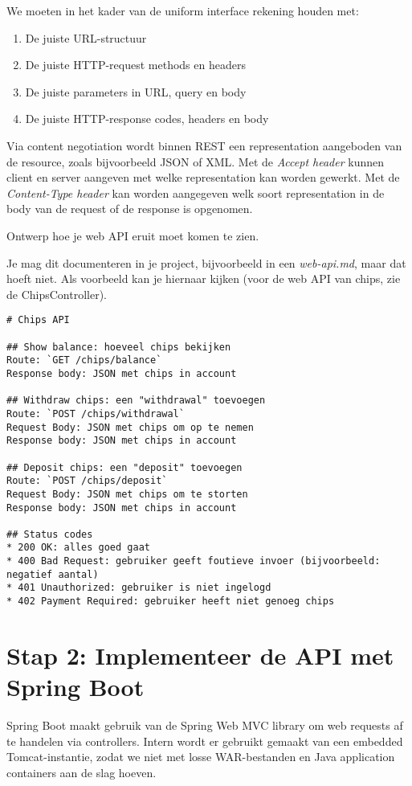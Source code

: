 We moeten in het kader van de uniform interface rekening houden met:
\begin{enumerate}
    \item De juiste URL-structuur
    \item De juiste HTTP-request methods en headers
    \item De juiste parameters in URL, query en body
    \item De juiste HTTP-response codes, headers en body
\end{enumerate}

Via content negotiation wordt binnen REST een representation 
aangeboden van de resource, zoals bijvoorbeeld JSON of XML. 
Met de \textit{Accept header} kunnen client en server aangeven 
met welke representation kan worden gewerkt. 
Met de \textit{Content-Type header} kan worden aangegeven 
welk soort representation in de body van de request of de response is opgenomen.

Ontwerp hoe je web API eruit moet komen te zien.

Je mag dit documenteren in je project,
bijvoorbeeld in een \textit{web-api.md}, maar dat hoeft niet.
Als voorbeeld kan je hiernaar kijken (voor de web API van chips, zie de ChipsController).
\begin{verbatim}
# Chips API

## Show balance: hoeveel chips bekijken
Route: `GET /chips/balance`
Response body: JSON met chips in account

## Withdraw chips: een "withdrawal" toevoegen
Route: `POST /chips/withdrawal`
Request Body: JSON met chips om op te nemen
Response body: JSON met chips in account

## Deposit chips: een "deposit" toevoegen
Route: `POST /chips/deposit`
Request Body: JSON met chips om te storten
Response body: JSON met chips in account

## Status codes
* 200 OK: alles goed gaat
* 400 Bad Request: gebruiker geeft foutieve invoer (bijvoorbeeld: negatief aantal)
* 401 Unauthorized: gebruiker is niet ingelogd 
* 402 Payment Required: gebruiker heeft niet genoeg chips
\end{verbatim}

\section{Stap 2: Implementeer de API met Spring Boot}
Spring Boot maakt gebruik van de Spring Web MVC library om web requests
af te handelen via controllers. 
Intern wordt er gebruikt gemaakt van een embedded Tomcat-instantie,
zodat we niet met losse WAR-bestanden en Java application containers aan de slag hoeven.

